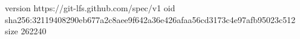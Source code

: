 version https://git-lfs.github.com/spec/v1
oid sha256:32119408290eb677a2c8aee9f642a36e426afaa56cd3173c4e97afb95023c512
size 262240
